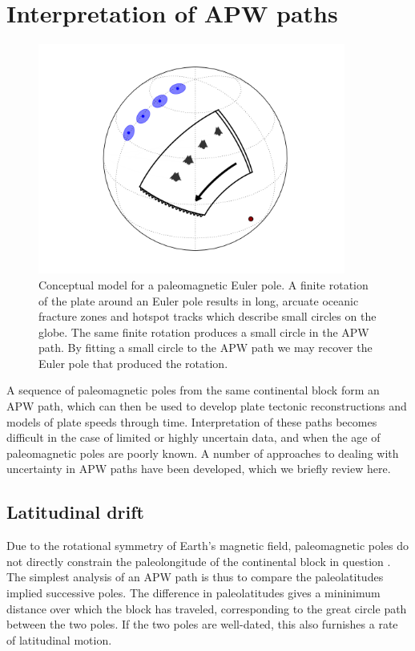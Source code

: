 \documentclass[preprint,12pt,authoryear]{elsarticle}
\begin{document}
\section{Interpretation of APW paths}
\label{sec:apwp}
\begin{figure}
\includegraphics[width=0.9\textwidth]{figures/cartoon/paleomagnetic_euler_pole.png}
\caption[Conceptual model for a paleomagnetic Euler pole.]{Conceptual model for a paleomagnetic Euler pole. A finite rotation of the plate around an Euler pole results in long, arcuate oceanic fracture zones and hotspot tracks which describe small circles on the globe. The same finite rotation produces a small circle in the APW path. By fitting a small circle to the APW path we may recover the Euler pole that produced the rotation.}
\label{fig:pep}
\end{figure}
A sequence of paleomagnetic poles from the same continental block form an APW path,
which can then be used to develop plate tectonic reconstructions and models
of plate speeds through time. Interpretation of these paths becomes difficult in the
case of limited or highly uncertain data, and when the age of paleomagnetic poles are poorly
known. A number of approaches to dealing with uncertainty in APW paths have been developed,
which we briefly review here.

\subsection{Latitudinal drift}
Due to the rotational symmetry of Earth's magnetic field, paleomagnetic poles do not
directly constrain the paleolongitude of the continental block in question \citep{butler1992paleomagnetism}.
The simplest analysis of an APW path is thus to compare the paleolatitudes implied successive poles.
The difference in paleolatitudes gives a mininimum distance over which the block has traveled, 
corresponding to the great circle path between the two poles. If the two poles are well-dated,
this also furnishes a rate of latitudinal motion.
\end{document}
